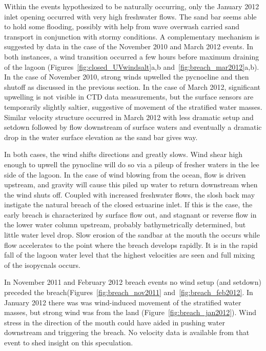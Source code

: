 Within the events hypothesized to be naturally occurring, only the January 2012 inlet opening occurred with very high freshwater flows. The sand bar seems able to hold some flooding, possibly with help from wave overwash carried sand transport in conjunction with stormy conditions.  A complementary mechanism is suggested by data in the case of the November 2010 and March 2012 events. In both instances, a wind transition occurred a few hours before maximum draining of the lagoon (Figures~\ref{fig:closed_UVwindsalt}a,b and~\ref{fig:breach_mar2012}a,b). In the case of November 2010, strong winds upwelled the pycnocline and then shutoff as discussed in the previous section. In the case of March 2012, significant upwelling is not visible in CTD data measurements, but the surface sensors are temporarily slightly saltier, suggestive of movement of the stratified water masses. Similar velocity structure occurred in March 2012 with less dramatic setup and setdown followed by flow downstream of surface waters and eventually a dramatic drop in the water surface elevation as the sand bar gives way. 

In both cases, the wind shifts directions and greatly slows. Wind shear high enough to upwell the pynocline will do so via a pileup of fresher waters in the lee side of the lagoon. In the case of wind blowing from the ocean, flow is driven upstream, and gravity will cause this piled up water to return downstream when the wind shuts off. Coupled with increased freshwater flows, the slosh back may instigate the natural breach of the closed estuarine inlet. 
If this is the case, the early breach is characterized by surface flow out, and stagnant or reverse flow in the lower water column upstream, probably bathymetrically determined, but little water level drop. Slow erosion of the sandbar at the mouth the occurs while flow accelerates to the point where the breach develops rapidly. It is in the rapid fall of the lagoon water level that the highest velocities are seen and full mixing of the isopycnals occurs. 

In November 2011 and February 2012 breach events no wind setup (and setdown) preceded the breach(Figures~\ref{fig:breach_nov2011} and~\ref{fig:breach_feb2012}. In January 2012 there was was wind-induced movement of the stratified water masses, but strong wind was from the land (Figure~\ref{fig:breach_jan2012}). Wind stress in the direction of the mouth could have aided in pushing water downstream and triggering the breach. No velocity data is available from that event to shed insight on this speculation.

